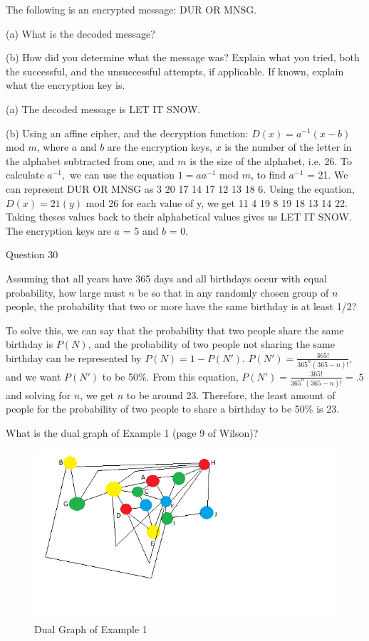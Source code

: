\documentclass{article}
\begin{document}
\clearpage
\header
The following is an encrypted message: DUR OR MNSG.
\item[](a) What is the decoded message?
\item[](b) How did you determine what the message was? Explain what you tried, both the successful, and the unsuccessful attempts, if applicable. If known, explain what the encryption key is.
\item[](a) The decoded message is LET IT SNOW.
\item[](b) Using an affine cipher, and the decryption function: $D(x) = a^{-1}(x-b)$ mod $m$, where $a$ and $b$ are the encryption keys, $x$ is the number of the letter in the alphabet subtracted from one, and $m$ is the size of the alphabet, i.e. 26. To calculate $a^{-1},$ we can use the equation $1 = aa^{-1}$ mod $m$, to find $a^{-1}$ = 21. We can represent DUR OR MNSG as 3 20 17 14 17 12 13 18 6. Using the equation, $D(x) = 21(y)$ mod 26 for each value of y, we get 11 4 19 8 19 18 13 14 22. Taking theses values back to their alphabetical values gives us LET IT SNOW. The encryption keys are $a$ = 5 and $b$ = 0.


\clearpage
{} Question 30
\item[]Assuming that all years have 365 days and all birthdays occur with equal probability, how large must $n$ be so that in any randomly chosen group of $n$ people, the probability that two or more have the same birthday is at least 1/2?
\item[]To solve this, we can say that the probability that two people share the same birthday is $P(N)$, and the probability of two people not sharing the same birthday can be represented by $P(N) = 1 - P(N')$. $P(N') = \frac{365!}{365^{n}(365 - n)!}$, and we want $P(N')$ to be 50\%. From this equation, $P(N') = \frac{365!}{365^{n}(365 - n)!} = .5$ and solving for $n$, we get $n$ to be around 23. Therefore, the least amount of people for the probability of two people to share a birthday to be 50\% is 23.


\clearpage
\header
What is the dual graph of Example 1 (page 9 of Wilson)?
\begin{figure}[h!]
  \includegraphics[width=\linewidth]{Untitled.png}
  \caption{Dual Graph of Example 1}
  \label{fig:map1}
\end{figure}
\end{document}
